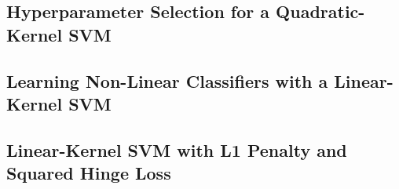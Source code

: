 \documentclass[11pt, answers]{exam}
\begin{document}
  \subsection{Hyperparameter Selection for a Quadratic-Kernel SVM}%
  \label{sub:hyperparameter_selection_for_a_quadratic_kernel_svm}

  \begin{solution}\begin{parts}
    \part \begin{enumerate}[(i)]
      \item
      \item
    \end{enumerate}
    \part
  \end{parts}\end{solution}

  \subsection{Learning Non-Linear Classifiers with a Linear-Kernel SVM}%
  \label{sub:learning_non_linear_classifiers_with_a_linear_kernel_svm}

  \begin{solution}\begin{parts}
    \part
    \part
  \end{parts}\end{solution}

  \subsection{Linear-Kernel SVM with L1 Penalty and Squared Hinge Loss}%
  \label{sub:linear_kernel_svm_with_l1_penalty_and_squared_hinge_loss}

  \begin{solution}\begin{parts}
    \part
    \part
    \part
    \part
  \end{parts}\end{solution}
\end{document}
